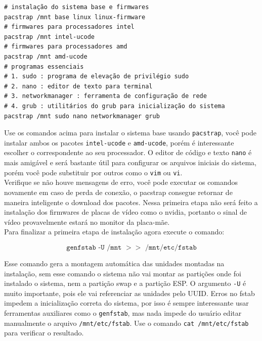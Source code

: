 \documentclass[12pt,a4paper]{article}
\begin{document}
\begin{lstlisting}
# instalação do sistema base e firmwares 
pacstrap /mnt base linux linux-firmware
# firmwares para processadores intel
pacstrap /mnt intel-ucode 
# firmwares para processadores amd
pacstrap /mnt amd-ucode
# programas essenciais 
# 1. sudo : programa de elevação de privilégio sudo 
# 2. nano : editor de texto para terminal 
# 3. networkmanager : ferramenta de configuração de rede 
# 4. grub : utilitários do grub para inicialização do sistema
pacstrap /mnt sudo nano networkmanager grub
\end{lstlisting}

\vspace{\baselineskip}

Use os comandos acima para instalar o sistema base usando \texttt{pacstrap}, você pode instalar ambos os pacotes \texttt{intel-ucode} e \texttt{amd-ucode}, porém é interessante escolher o correspondente ao seu processador. O editor de código e texto \texttt{nano} é mais amigável e será bastante útil para configurar os arquivos iniciais do sistema, porém você pode substituir por outros como o \texttt{vim} ou \texttt{vi}.\\

Verifique se não houve mensagens de erro, você pode executar os comandos novamente em caso de perda de conexão, o pacstrap consegue retornar de maneira inteligente o download dos pacotes. Nessa primeira etapa não será feito a instalação dos firmwares de placas de vídeo como o nvidia, portanto o sinal de vídeo provavelmente estará no monitor da placa-mãe. \\

Para finalizar a primeira etapa de instalação agora execute o comando:

$$ \texttt{genfstab -U /mnt $>>$ /mnt/etc/fstab} $$

\vspace{\baselineskip}

Esse comando gera a montagem automática das unidades montadas na instalação, sem esse comando o sistema não vai montar as partições onde foi instalado o sistema, nem a partição swap e a partição ESP. O argumento \texttt{-U} é muito importante, pois ele vai referenciar as unidades pelo UUID. Erros no fstab impedem a inicialização correta do sistema, por isso é sempre interessante usar ferramentas auxiliares como o \texttt{genfstab}, mas nada impede do usuário editar manualmente o arquivo \texttt{/mnt/etc/fstab}. Use o comando \texttt{cat /mnt/etc/fstab} para verificar o resultado. \\
\end{document}

